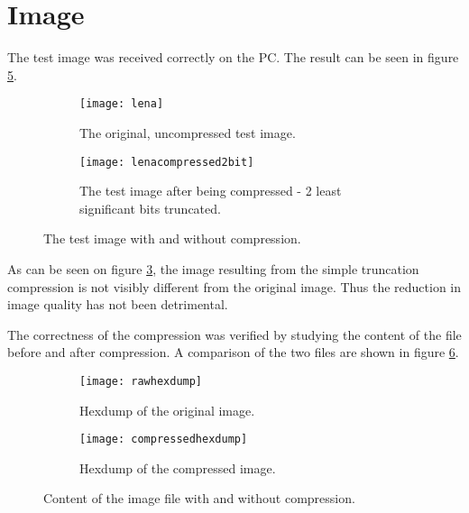 \section{Image}

The test image was received correctly on the PC. The result can be seen in figure \ref{fig:compressedlena}.

\begin{figure}[H]
\centering
\begin{subfigure}{.5\textwidth}
  \centering
  \texttt{[image: lena]}
  \caption{The original, uncompressed test image.}
  \label{fig:lena}
\end{subfigure}%
\begin{subfigure}{.5\textwidth}
  \centering
  \texttt{[image: lenacompressed2bit]}
  \caption{The test image after being  compressed - 2 least significant bits truncated.}
  \label{fig:compressedlena}
\end{subfigure}
\caption{The test image with and without compression.}
\label{fig:lenacomp}
\end{figure}

As can be seen on figure \ref{fig:lenacomp}, the image resulting from the simple truncation compression is not visibly different from the original image. Thus the reduction in image quality has not been detrimental.

The correctness of the compression was verified by studying the content of the file before and after compression. A comparison of the two files are shown in figure \ref{fig:hexlenacomp}. 

\begin{figure}[H]
\centering
\begin{subfigure}{.5\textwidth}
  \centering
  \texttt{[image: rawhexdump]}
  \caption{Hexdump of the original image.}
  \label{fig:lena}
\end{subfigure}%
\begin{subfigure}{.5\textwidth}
  \centering
  \texttt{[image: compressedhexdump]}
  \caption{Hexdump of the compressed image.}
  \label{fig:compressedlena}
\end{subfigure}
\caption{Content of the image file with and without compression.}
\label{fig:hexlenacomp}
\end{figure}


